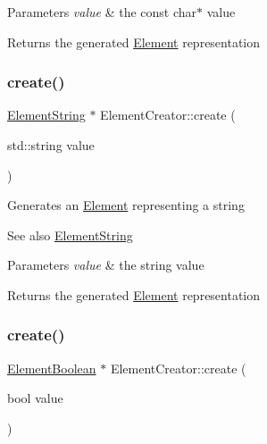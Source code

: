 \begin{DoxyParams}{Parameters}
{\em value} & the const char$\ast$ value \\
\hline
\end{DoxyParams}
\begin{DoxyReturn}{Returns}
the generated \mbox{\hyperlink{classElement}{Element}} representation 
\end{DoxyReturn}
\mbox{\label{classElementCreator_ab1342c3ed8561bf9ad762c7446a3f4e8}} 
\subsubsection{\texorpdfstring{create()}{create()}\hspace{0.1cm}{\footnotesize\ttfamily [5/6]}}
{\footnotesize\ttfamily \mbox{\hyperlink{classElementString}{Element\+String}} $\ast$ Element\+Creator\+::create (\begin{DoxyParamCaption}\item[{std\+::string}]{value }\end{DoxyParamCaption})\hspace{0.3cm}{\ttfamily [static]}}

Generates an \mbox{\hyperlink{classElement}{Element}} representing a string \begin{DoxySeeAlso}{See also}
\mbox{\hyperlink{classElementString}{Element\+String}}
\end{DoxySeeAlso}

\begin{DoxyParams}{Parameters}
{\em value} & the string value \\
\hline
\end{DoxyParams}
\begin{DoxyReturn}{Returns}
the generated \mbox{\hyperlink{classElement}{Element}} representation 
\end{DoxyReturn}
\mbox{\label{classElementCreator_aca695a65aa4ef18a480ed380d07e7adf}} 
\subsubsection{\texorpdfstring{create()}{create()}\hspace{0.1cm}{\footnotesize\ttfamily [6/6]}}
{\footnotesize\ttfamily \mbox{\hyperlink{classElementBoolean}{Element\+Boolean}} $\ast$ Element\+Creator\+::create (\begin{DoxyParamCaption}\item[{bool}]{value }\end{DoxyParamCaption})\hspace{0.3cm}{\ttfamily [static]}}

